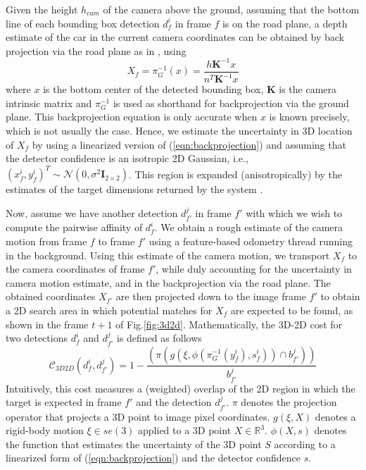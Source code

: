 \documentclass[letterpaper, 10 pt, conference]{ieeeconf}
\begin{document}
Given the height $h_{cam}$ of the camera above the ground, assuming that the bottom line of each bounding box detection $d^i_f$ in frame $f$ is on the road plane, a depth estimate of the car in the current camera coordinates can be obtained by back projection via the road plane as in \cite{chandraker2015}, using 
\begin{equation}
X_f = \pi_G^{-1}(x) = \frac{h\mathbf{K}^{-1}x}{n^T\mathbf{K}^{-1}x}
\label{eqn:backprojection}
\end{equation}
where $x$ is the bottom center of the detected bounding box, \textbf{K} is the camera intrinsic matrix and $\pi_G^{-1}$ is used as shorthand for backprojection via the ground plane. This backprojection equation is only accurate when $x$ is known precisely, which is not usually the case. Hence, we estimate the uncertainty in 3D location of $X_f$ by using a linearized version of (\ref{eqn:backprojection}) and assuming that the detector confidence is an isotropic 2D Gaussian, i.e., $(x^i_f, y^i_f)^T \sim \mathcal{N}(0,\sigma^2\mathbf{I}_{2\times2})$. This region is expanded (anisotropically) by the estimates of the target dimensions returned by the system \cite{KM_ICRA}.

Now, assume we have another detection $d^j_{f'}$ in frame $f'$ with which we wish to compute the pairwise affinity of $d^i_f$. We obtain a rough estimate of the camera motion from frame $f$ to frame $f'$ using a feature-based odometry thread running in the background. Using this estimate of the camera motion, we transport $X_f$ to the camera coordinates of frame $f'$, while duly accounting for the uncertainty in camera motion estimate, and in the backprojection via the road plane. The obtained coordinates $X_{f'}$ are then projected down to the image frame $f'$ to obtain a 2D search area in which potential matches for $X_f$ are expected to be found, as shown in the  frame $t+1$ of Fig.\ref{fig:3d2d}. Mathematically, the 3D-2D cost for two detections $d^i_f$ and $d^j_{f'}$ is defined as follows
\begin{equation}
\mathcal{C}_{3D2D}(d^i_f, d^j_{f'}) = 1 - \frac{(\pi(g(\xi, \phi(\pi_G^{-1}(y^i_f), s^i_f)) \cap b^j_{f'}))}{b^j_{f'}}
\label{eqn:3D-2D}
\end{equation}
Intuitively, this cost measures a (weighted) overlap of the 2D region in which the target is expected in frame $f'$ and the detection $d^j_{f'}$. $\pi$ denotes the projection operator that projects a 3D point to image pixel coordinates. $g(\xi,X)$ denotes a rigid-body motion $\xi \in se(3)$ applied to a 3D point $X \in \mathbb{R}^3$. $\phi(X,s)$ denotes the function that estimates the uncertainty of the 3D point $S$ according to a linearized form of (\ref{eqn:backprojection}) and the detector confidence $s$.
\end{document}
